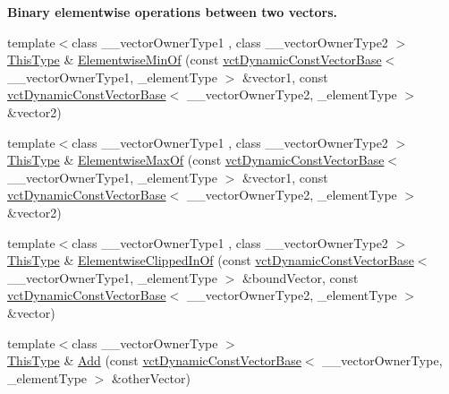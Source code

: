 \begin{Indent}{\bf Binary elementwise operations between two vectors.}
\begin{DoxyCompactItemize}
\item 
{\footnotesize template$<$class \-\_\-\-\_\-vector\-Owner\-Type1 , class \-\_\-\-\_\-vector\-Owner\-Type2 $>$ }\\\hyperlink{classvct_dynamic_const_vector_base_a39da273523717f678f54d3321ebca3dd}{This\-Type} \& \hyperlink{classvct_dynamic_vector_base_abedada58a344d1b9d9905c72d953d9e8}{Elementwise\-Min\-Of} (const \hyperlink{classvct_dynamic_const_vector_base}{vct\-Dynamic\-Const\-Vector\-Base}$<$ \-\_\-\-\_\-vector\-Owner\-Type1, \-\_\-element\-Type $>$ \&vector1, const \hyperlink{classvct_dynamic_const_vector_base}{vct\-Dynamic\-Const\-Vector\-Base}$<$ \-\_\-\-\_\-vector\-Owner\-Type2, \-\_\-element\-Type $>$ \&vector2)
\item 
{\footnotesize template$<$class \-\_\-\-\_\-vector\-Owner\-Type1 , class \-\_\-\-\_\-vector\-Owner\-Type2 $>$ }\\\hyperlink{classvct_dynamic_const_vector_base_a39da273523717f678f54d3321ebca3dd}{This\-Type} \& \hyperlink{classvct_dynamic_vector_base_ab3874cad21ff8758f4df3171a347e534}{Elementwise\-Max\-Of} (const \hyperlink{classvct_dynamic_const_vector_base}{vct\-Dynamic\-Const\-Vector\-Base}$<$ \-\_\-\-\_\-vector\-Owner\-Type1, \-\_\-element\-Type $>$ \&vector1, const \hyperlink{classvct_dynamic_const_vector_base}{vct\-Dynamic\-Const\-Vector\-Base}$<$ \-\_\-\-\_\-vector\-Owner\-Type2, \-\_\-element\-Type $>$ \&vector2)
\item 
{\footnotesize template$<$class \-\_\-\-\_\-vector\-Owner\-Type1 , class \-\_\-\-\_\-vector\-Owner\-Type2 $>$ }\\\hyperlink{classvct_dynamic_const_vector_base_a39da273523717f678f54d3321ebca3dd}{This\-Type} \& \hyperlink{classvct_dynamic_vector_base_a9a5e7b9273dd0a6bcd1634e87ce30cb0}{Elementwise\-Clipped\-In\-Of} (const \hyperlink{classvct_dynamic_const_vector_base}{vct\-Dynamic\-Const\-Vector\-Base}$<$ \-\_\-\-\_\-vector\-Owner\-Type1, \-\_\-element\-Type $>$ \&bound\-Vector, const \hyperlink{classvct_dynamic_const_vector_base}{vct\-Dynamic\-Const\-Vector\-Base}$<$ \-\_\-\-\_\-vector\-Owner\-Type2, \-\_\-element\-Type $>$ \&vector)
\item 
{\footnotesize template$<$class \-\_\-\-\_\-vector\-Owner\-Type $>$ }\\\hyperlink{classvct_dynamic_const_vector_base_a39da273523717f678f54d3321ebca3dd}{This\-Type} \& \hyperlink{classvct_dynamic_vector_base_a4eb825f90117f38bfebe2ba99521162e}{Add} (const \hyperlink{classvct_dynamic_const_vector_base}{vct\-Dynamic\-Const\-Vector\-Base}$<$ \-\_\-\-\_\-vector\-Owner\-Type, \-\_\-element\-Type $>$ \&other\-Vector)

\end{DoxyCompactItemize}
\end{Indent}
